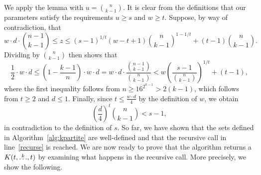 We apply the lemma with $u = \binom{n}{k-1}$.
It is clear from the definitions that our parameters satisfy the requirements $u \geq s$ and $w \geq t$.
Suppose, by way of contradiction, that
\[
    w \cdot d \cdot \binom{n - 1}{k-1} \leq z \leq (s - 1)^{1 / t}(w - t + 1)\binom{n}{k-1}^{1 - 1 / t} + (t - 1)\binom{n}{k-1}.
\]
Dividing by $\binom{n}{k-1}$ then shows that
\[
    \frac{1}{2} \cdot w \cdot d
    \leq \left( 1 - \frac{k-1}{n}\right) \cdot w \cdot d
    = w \cdot d \cdot \frac{\binom{n-1}{k-1}}{\binom{n}{k-1}}
    < w \left( \frac{s-1}{\binom{n}{k-1} }\right)^{1 / t} + (t - 1),
\]
where the first inequality follows from $n \geq 16^{2^{k-1}} > 2(k-1)$, which follows from $t \geq 2$ and $d \leq 1$.
Finally, since $t \leq \frac{w \cdot d}{4}$ by the definition of $w$, we obtain
\[
    \left( \frac{d}{4}\right)^t \binom{n}{k-1} < s-1,
\]
in contradiction to the definition of $s$.
So far, we have shown that the sets defined in Algorithm~\ref{alg:kpartite}
are well-defined and that the recursive call in line~\ref{recurse} is reached.
We are now ready to prove that the algorithm returns a $K(t, \overset{k}{\dots}, t)$
by examining what happens in the recursive call.
More precisely, we show the following.

